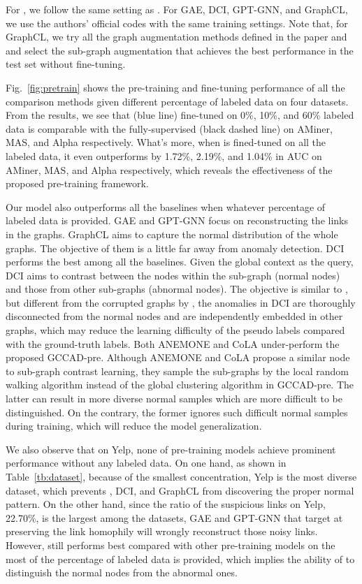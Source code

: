 For \pmodel, we follow the same setting as \model. For GAE, DCI, GPT-GNN, and GraphCL, we use the authors' official codes with the same training settings. Note that, for GraphCL, we try all the graph augmentation methods defined in the paper and and select the sub-graph augmentation that achieves the best performance in the test set without fine-tuning.

 Fig.~\ref{fig:pretrain} shows the pre-training and fine-tuning performance of all the comparison methods given different percentage of labeled data on four datasets. 
From the results, we see that \spmodel (blue line) fine-tuned on 0\%, 10\%, and 60\% labeled data is comparable with the fully-supervised \smodel (black dashed line) on AMiner, MAS, and Alpha respectively. 
What's more, when \spmodel is fined-tuned on all the labeled data, it even outperforms \smodel by 1.72\%, 2.19\%, and 1.04\% in AUC on AMiner, MAS, and Alpha respectively, which reveals the effectiveness of the proposed pre-training framework. 

Our model also outperforms all the baselines when whatever percentage of labeled data is provided. 
GAE and GPT-GNN focus on reconstructing the links in the graphs.
GraphCL aims to capture the normal distribution of the whole graphs.
The objective of them is a little far away from anomaly detection. 
DCI performs the best among all the baselines. Given the global context as the query, DCI aims to contrast between the nodes within the sub-graph (normal nodes) and those from other sub-graphs (abnormal nodes). The objective is similar to \pmodel, but different from the corrupted graphs by \pmodel, the anomalies in DCI are thoroughly disconnected from the normal nodes and are independently embedded in other graphs, 
which may reduce the learning difficulty of the pseudo labels compared with the ground-truth labels. 
Both ANEMONE and CoLA under-perform the proposed GCCAD-pre. Although ANEMONE and CoLA propose a similar node to sub-graph contrast learning, they sample the sub-graphs by the local random walking algorithm instead of the global clustering algorithm in GCCAD-pre. The latter can result in more diverse normal samples which are more difficult to be distinguished. On the contrary, the former ignores such difficult normal samples during training, which will reduce the model generalization.

We also observe that on Yelp, none of pre-training models achieve prominent performance without any labeled data. 
On one hand, as shown in Table~\ref{tb:dataset}, because of the smallest concentration, Yelp is the most diverse dataset, which prevents \pmodel, DCI, and GraphCL from discovering the proper normal pattern.
On the other hand, since the ratio of the suspicious links on Yelp, 22.70\%, is the largest among the datasets, GAE and GPT-GNN that target at preserving the link homophily will wrongly reconstruct those noisy links. 
However, \spmodel still performs best compared with other pre-training models on the most of the percentage of labeled data is provided, which implies the ability of \spmodel to distinguish the normal nodes from the abnormal ones.     

